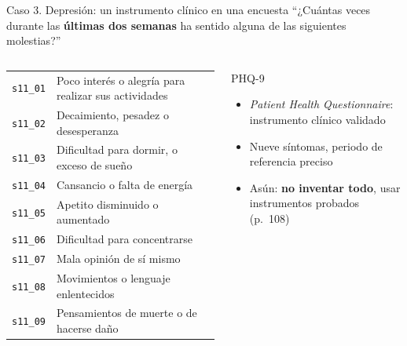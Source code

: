 \documentclass[aspectratio=169,11pt]{beamer}
\newcommand{\hl}[1]{\textcolor{marino}{\textbf{#1}}}        %
\newcommand{\code}[1]{\texttt{\small #1}}                    %
\renewcommand{\arraystretch}{1.5}
\begin{document}
\begin{frame}{Caso 3. Depresión: un instrumento clínico en una encuesta}
\small
``¿Cuántas veces durante las \textbf{últimas dos semanas} ha sentido alguna de las siguientes molestias?''
\medskip

\begin{columns}[T]
\footnotesize
\renewcommand{\arraystretch}{1.2}
\begin{tabular}{lp{}}
\toprule
\rowcolor{crema} \code{s11\_01} & Poco interés o alegría para realizar sus actividades \\
\code{s11\_02} & Decaimiento, pesadez o desesperanza \\
\rowcolor{crema} \code{s11\_03} & Dificultad para dormir, o exceso de sueño \\
\code{s11\_04} & Cansancio o falta de energía \\
\rowcolor{crema} \code{s11\_05} & Apetito disminuido o aumentado \\
\code{s11\_06} & Dificultad para concentrarse \\
\rowcolor{crema} \code{s11\_07} & Mala opinión de sí mismo \\
\code{s11\_08} & Movimientos o lenguaje enlentecidos \\
\rowcolor{crema} \code{s11\_09} & Pensamientos de muerte o de hacerse daño \\
\bottomrule
\end{tabular}
\begin{block}{PHQ-9}
\small
\begin{itemize}
  \item \textit{Patient Health Questionnaire}: instrumento clínico validado
  \item Nueve síntomas, periodo de referencia preciso
  \item Asún: \hl{no inventar todo}, usar instrumentos probados (p.~108)
\end{itemize}
\end{block}
\end{columns}
\end{frame}
\end{document}
